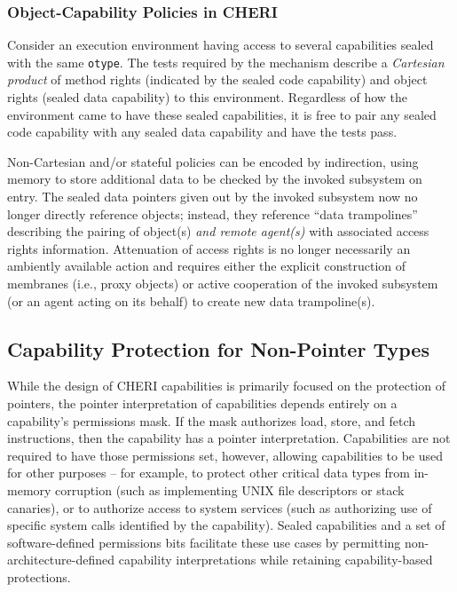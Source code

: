 \subsubsection{Object-Capability Policies in CHERI}

Consider an execution environment having access to several capabilities
sealed with the same \texttt{otype}.  The tests required by the
 mechanism describe a \emph{Cartesian product} of method
rights (indicated by the sealed code capability) and object rights (sealed data
capability) to this environment.  Regardless of how the environment
came to have these sealed capabilities, it is free to pair any sealed code
capability with any sealed data capability and have the 
tests pass.

Non-Cartesian and/or stateful policies can be encoded by
indirection, using memory to store additional data to be checked by the
invoked subsystem on entry.  The sealed data pointers given out by the
invoked subsystem now no longer directly reference objects; instead, they
reference ``data trampolines'' describing the pairing of object(s) \emph{and
remote agent(s)} with associated access rights information.  Attenuation of
access rights is no longer necessarily an ambiently available action and
requires either the explicit construction of membranes (i.e., proxy objects)
or active cooperation of the invoked subsystem (or an agent acting on its
behalf) to create new data trampoline(s).

\subsection{Capability Protection for Non-Pointer Types}

While the design of CHERI capabilities is primarily focused on the protection
of pointers, the pointer interpretation of capabilities depends entirely on
a capability's permissions mask.
If the mask authorizes load, store, and fetch instructions, then the
capability has a pointer interpretation.
Capabilities are not required to have those permissions set, however, allowing
capabilities to be used for other purposes -- for example, to protect other
critical data types from in-memory corruption (such as implementing UNIX file
descriptors or stack canaries), or to authorize access to system services
(such as authorizing use of specific system calls identified by the
capability).
Sealed capabilities and a set of software-defined permissions bits facilitate
these use cases by permitting non-architecture-defined capability
interpretations while retaining capability-based protections.

